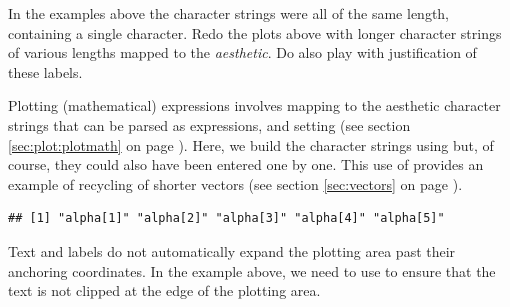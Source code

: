 \documentclass[krantz2]{krantz}\usepackage{knitr}
\begin{document}
\begin{playground}
In the examples above the character strings were all of the same length, containing a single character. Redo the plots above with longer character strings of various lengths mapped to the  \emph{aesthetic}. Do also play with justification of these labels.
\end{playground}

Plotting (mathematical) expressions involves mapping to the  aesthetic character strings that can be parsed as expressions, and setting  (see section \ref{sec:plot:plotmath} on page \pageref{sec:plot:plotmath}). Here, we build the character strings using  but, of course, they could also have been entered one by one. This use of  provides an example of recycling of shorter vectors (see section \ref{sec:vectors} on page \pageref{sec:vectors}).

\begin{knitrout}\footnotesize
{}\color{fgcolor}\begin{kframe}
\begin{alltt}
 \hlkwb{<-}
  \hlstd{(} \hlstd{=} \hlopt{:}\hlstd{,}  \hlstd{=} \hlstd{(}\hlstd{,} \hlstd{),}  \hlstd{=} \hlstd{(}\hlstr{"alpha["}\hlstd{,} \hlopt{:}\hlstd{,} \hlstr{"]"}\hlstd{,}  \hlstd{=} \hlstd{))}
\hlopt{$}
\end{alltt}
\begin{verbatim}
## [1] "alpha[1]" "alpha[2]" "alpha[3]" "alpha[4]" "alpha[5]"
\end{verbatim}
\end{kframe}
\end{knitrout}

Text and labels do not automatically expand the plotting area past their anchoring coordinates. In the example above, we need to use  to ensure that the text is not clipped at the edge of the plotting area.
\end{document}
